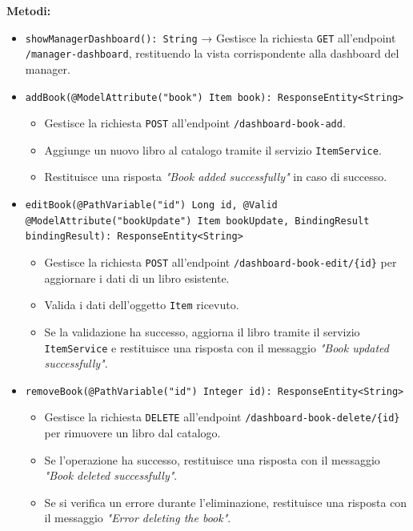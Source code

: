 \documentclass[twoside,openright,titlepage,fleqn,headinclude,12pt,a4paper,BCOR=5mm,footinclude]{scrbook}
\begin{document}
\textbf{Metodi:}  
\begin{itemize}  
    \item \texttt{showManagerDashboard(): String} → Gestisce la richiesta \texttt{GET} all'endpoint \texttt{/manager-dashboard}, restituendo la vista corrispondente alla dashboard del manager.  

    \item \texttt{addBook(@ModelAttribute("book") Item book): ResponseEntity<String>}  
    \begin{itemize}  
        \item Gestisce la richiesta \texttt{POST} all’endpoint \texttt{/dashboard-book-add}.  
        \item Aggiunge un nuovo libro al catalogo tramite il servizio \texttt{ItemService}.  
        \item Restituisce una risposta \textit{"Book added successfully"} in caso di successo.  
    \end{itemize}  

    \item \texttt{editBook(@PathVariable("id") Long id, @Valid @ModelAttribute("bookUpdate") Item bookUpdate, BindingResult bindingResult): ResponseEntity<String>}  
    \begin{itemize}  
        \item Gestisce la richiesta \texttt{POST} all’endpoint \texttt{/dashboard-book-edit/\{id\}} per aggiornare i dati di un libro esistente.  
        \item Valida i dati dell'oggetto \texttt{Item} ricevuto. 
        \item Se la validazione ha successo, aggiorna il libro tramite il servizio \texttt{ItemService} e restituisce una risposta con il messaggio \textit{"Book updated successfully"}.  
    \end{itemize}  

    \item \texttt{removeBook(@PathVariable("id") Integer id): ResponseEntity<String>}  
    \begin{itemize}  
        \item Gestisce la richiesta \texttt{DELETE} all’endpoint \texttt{/dashboard-book-delete/\{id\}} per rimuovere un libro dal catalogo.  
        \item Se l’operazione ha successo, restituisce una risposta con il messaggio \textit{"Book deleted successfully"}.  
        \item Se si verifica un errore durante l'eliminazione, restituisce una risposta con il messaggio \textit{"Error deleting the book"}.  
    \end{itemize}  
\end{itemize}  
\end{document}
